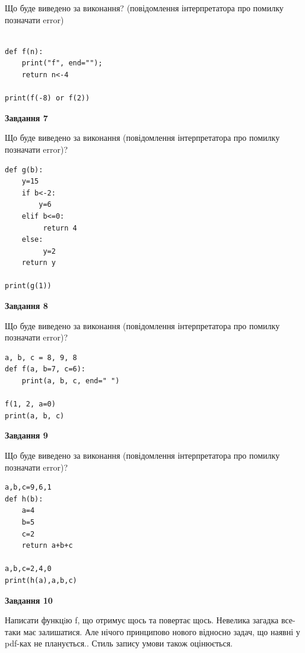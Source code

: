 \documentclass[12pt, ukrainian]{article}
\begin{document}
{\begin {large}
Що буде виведено за виконання? (повідомлення інтерпретатора про помилку позначати error)\par
\begin{verbatim}

def f(n):
    print("f", end="");
    return n<-4

print(f(-8) or f(2))
\end{verbatim}

{\begin {center}\textbf{Завдання 7}\end {center}}

Що буде виведено за виконання (повідомлення інтерпретатора про помилку позначати error)?\par
\begin{verbatim}
def g(b):
    y=15
    if b<-2: 
        y=6
    elif b<=0:
         return 4
    else:
         y=2
    return y

print(g(1))
\end{verbatim}

{\begin {center}\textbf{Завдання 8}\end {center}}

Що буде виведено за виконання (повідомлення інтерпретатора про помилку позначати error)?\par
\begin{verbatim}
a, b, c = 8, 9, 8
def f(a, b=7, c=6):
    print(a, b, c, end=" ")

f(1, 2, a=0)
print(a, b, c)
\end{verbatim}

{\begin {center}\textbf{Завдання 9}\end {center}}

Що буде виведено за виконання (повідомлення інтерпретатора про помилку позначати error)?\par
\begin{verbatim}
a,b,c=9,6,1
def h(b):
    a=4
    b=5
    c=2
    return a+b+c

a,b,c=2,4,0
print(h(a),a,b,c)
\end{verbatim}

{\begin {center}\textbf{Завдання 10}\end {center}}


Написати функцiю f, що отримує щось та повертає щось. Невелика загадка все-таки має залишатися. Але нічого принципово нового відносно задач, що наявні у pdf-ках не планується.. Стиль запису умови також оцінюється.\par
\end {large}}
\newpage
\end{document}
